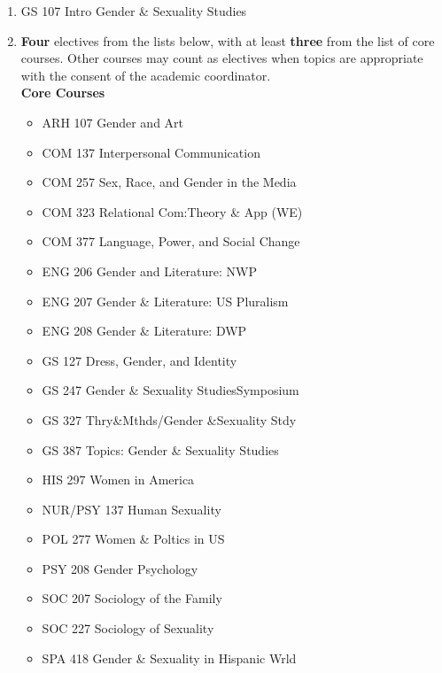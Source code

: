 \documentclass[
  letterpaper,
]{scrbook}
\providecommand{\tightlist}{%
  \setlength{\itemsep}{0pt}\setlength{\parskip}{0pt}}
\begin{document}
\begin{enumerate}
\def\labelenumi{\arabic{enumi}.}
\tightlist
\item
  GS 107 Intro Gender \& Sexuality Studies\\
\item
  \textbf{Four} electives from the lists below, with at least
  \textbf{three} from the list of core courses. Other courses may count
  as electives when topics are appropriate with the consent of the
  academic coordinator.\\
  \textbf{Core Courses}

  \begin{itemize}
  \tightlist
  \item
    ARH 107 Gender and Art\\
  \item
    COM 137 Interpersonal Communication\\
  \item
    COM 257 Sex, Race, and Gender in the Media\\
  \item
    COM 323 Relational Com:Theory \& App (WE)\\
  \item
    COM 377 Language, Power, and Social Change\\
  \item
    ENG 206 Gender and Literature: NWP\\
  \item
    ENG 207 Gender \& Literature: US Pluralism\\
  \item
    ENG 208 Gender \& Literature: DWP\\
  \item
    GS 127 Dress, Gender, and Identity\\
  \item
    GS 247 Gender \& Sexuality StudiesSymposium\\
  \item
    GS 327 Thry\&Mthds/Gender \&Sexuality Stdy\\
  \item
    GS 387 Topics: Gender \& Sexuality Studies\\
  \item
    HIS 297 Women in America\\
  \item
    NUR/PSY 137 Human Sexuality\\
  \item
    POL 277 Women \& Poltics in US\\
  \item
    PSY 208 Gender Psychology\\
  \item
    SOC 207 Sociology of the Family\\
  \item
    SOC 227 Sociology of Sexuality\\
  \item
    SPA 418 Gender \& Sexuality in Hispanic Wrld
  \end{itemize}


\end{enumerate}
\end{document}
